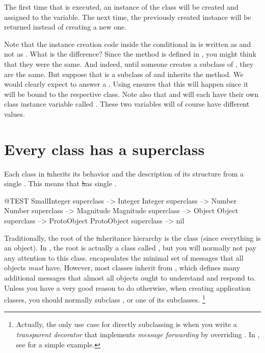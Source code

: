\documentclass[a4paper,10pt,twoside]{book}
\begin{document}
The first time that  is executed, an instance of the class  will be created and assigned to the  variable.
The next time, the previously created instance will be returned instead of creating a new one.

Note that the instance creation code inside the conditional in  is written as  and not as .
What is the difference?
Since the  method is defined in , you might think that they were the same.
And indeed, until someone creates a subclass of , they are the same.
But suppose that  is a subclass of  and inherits the  method.
We would clearly expect  to answer a .
Using \self ensures that this will happen since it will be bound to the respective class.
Note also that  and  will each have their own class instance variable called .
These two variables will of course have different values.

\section{Every class has a superclass}


Each class in \st inherits its behavior and the description of its structure from a single .
This means that \st has single .

\begin{code}{@TEST}
SmallInteger superclass --> Integer
Integer superclass          --> Number
Number superclass        --> Magnitude
Magnitude superclass    --> Object
Object superclass           --> ProtoObject
ProtoObject superclass  --> nil
\end{code}

Traditionally, the root of the \st inheritance hierarchy is the class  (since everything is an object).
In \squeak, the root is actually a class called , but you will normally not pay any attention to this class.
 encapsulates the minimal set of messages that all objects \emph{must} have.
However, most classes inherit from , which defines many additional messages that almost all objects ought to understand and respond to.
Unless you have a very good reason to do otherwise, when creating application classes, you should normally subclass , or one of its subclasses.%
\footnote{Actually, the only use case for directly subclassing  is when you write a \emph{transparent decorator} that implements \emph{message forwarding} by overriding .
	In \sq, see  for a simple example.}
\end{document}

